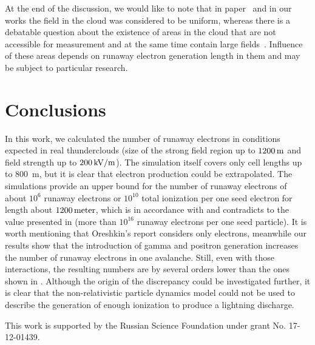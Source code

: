 \documentclass[doublecol,linenumbers]{epl2} %
\begin{document}
    
    At the end of the discussion, we would like to note that in paper~\cite{Oreshkin_2018} and in our works the field in the cloud was considered to be uniform, whereas there is a debatable question about the existence of areas in the cloud that are not accessible for measurement and at the same time contain large fields~\cite{dwyer2003fundamental}. Influence of these areas depends on runaway electron generation length in them and may be subject to particular research.
    
    \section{Conclusions}
    
    In this work, we calculated the number of runaway electrons in conditions expected in real thunderclouds (size of the strong field region up to $1200\un{m}$ and field strength up to $200\un{kV/m}$). The simulation itself covers only cell lengths up to 800~m, but it is clear that electron production could be extrapolated. The simulations provide an upper bound for the number of runaway electrons of about $10^6$ runaway electrons or $10^{10}$ total ionization per one seed electron for length about $1200\un{meter}$, which is in accordance with \cite{Gurevich:2001, Dwyer2013_radio} and contradicts to the value presented in \cite{Oreshkin_2018} (more than $10^{16}$ runaway electrons per one seed particle). It is worth mentioning that Oreshkin’s report considers only electrons, meanwhile our results show that the introduction of gamma and positron generation increases the number of runaway electrons in one avalanche. 
    Still, even with those interactions, the resulting numbers are by several orders lower than the ones shown in \cite{Oreshkin_2018}. Although the origin of the discrepancy could be investigated further, it is clear that the non-relativistic particle dynamics model could not be used to describe the generation of enough ionization to produce a lightning discharge.
    
    \acknowledgments
    This work is supported by the Russian Science Foundation under grant No. 17-12-01439.
    
    
    
\end{document}
